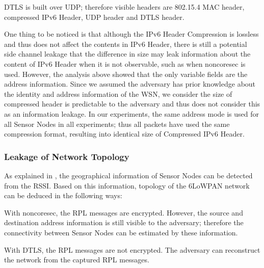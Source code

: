 DTLS is built over UDP; therefore visible headers are 802.15.4 MAC header, compressed IPv6 Header, UDP header and DTLS header.

One thing to be noticed is that although the IPv6 Header Compression is lossless and thus does not affect the contents in IPv6 Header, there is still a potential side channel leakage that the difference in size may leak information about the content of IPv6 Header when it is not observable, such as when noncoresec is used. However, the analysis above showed that the only variable fields are the address information. Since we assumed the adversary has prior knowledge about the identity and address information of the WSN, we consider the size of compressed header is predictable to the adversary and thus does not consider this as an information leakage. In our experiments, the same address mode is used for all Sensor Nodes in all experiments; thus all packets have used the same compression format, resulting into identical size of Compressed IPv6 Header.

\subsubsection{Leakage of Network Topology}


As explained in , the geographical information of Sensor Nodes can be detected from the RSSI. Based on this information, topology of the 6LoWPAN network can be deduced in the following ways:

\begin{description}[style=nextline]
	\item With noncoresec, the RPL messages are encrypted. However, the source and destination address information is still visible to the adversary; therefore the connectivity between Sensor Nodes can be estimated by these information.
	\item With DTLS, the RPL messages are not encrypted. The adversary can reconstruct the network from the captured RPL messages.
\end{description}

